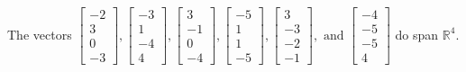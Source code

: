 \begin{exercise}
\begin{exerciseStatement}
  \end{exerciseStatement}
  \begin{exerciseAnswer}
   The vectors \(\left[\begin{array}{r}
-2 \\
3 \\
0 \\
-3
\end{array}\right] , \left[\begin{array}{r}
-3 \\
1 \\
-4 \\
4
\end{array}\right] , \left[\begin{array}{r}
3 \\
-1 \\
0 \\
-4
\end{array}\right] , \left[\begin{array}{r}
-5 \\
1 \\
1 \\
-5
\end{array}\right] , \left[\begin{array}{r}
3 \\
-3 \\
-2 \\
-1
\end{array}\right] , \text{ and } \left[\begin{array}{r}
-4 \\
-5 \\
-5 \\
4
\end{array}\right]\) 
  	 do  
	span \(\mathbb{R}^4\).
  


  \end{exerciseAnswer}
\end{exercise}